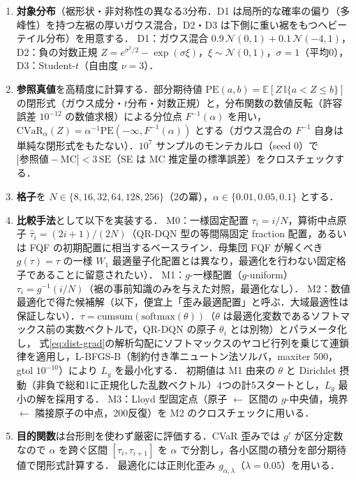 \documentclass[a4paper,10pt]{jsarticle}
\theoremstyle{definition}
\newcommand{\CVaR}{\mathrm{CVaR}}
\newcommand{\Finv}{F^{-1}}
\newcommand{\E}{\mathbb{E}}
\begin{document}
\begin{enumerate}
  \item \textbf{対象分布}（裾形状・非対称性の異なる3分布．D1 は局所的な確率の偏り（多峰性）を持つ左裾の厚いガウス混合，D2・D3 は下側に重い裾をもつヘビーテイル分布）を用意する．
  D1：ガウス混合 $0.9\,\mathcal N(0,1)+0.1\,\mathcal N(-4,1)$，
  D2：負の対数正規 $Z=e^{\sigma^2/2}-\exp(\sigma\xi)$，$\xi\sim\mathcal N(0,1)$，$\sigma=1$（平均0），
  D3：Student-$t$（自由度 $\nu=3$）．
  \item \textbf{参照真値}を高精度に計算する．部分期待値 $\mathrm{PE}(a,b)=\E[Z\,\mathbb{I}\{a<Z\le b\}]$ の閉形式（ガウス成分・$t$分布・対数正規）と，分布関数の数値反転（許容誤差 $10^{-12}$ の数値求根）による分位点 $\Finv(\alpha)$ を用い，
  $\CVaR_\alpha(Z)=\alpha^{-1}\mathrm{PE}(-\infty,\Finv(\alpha))$ とする（ガウス混合の $\Finv$ 自身は単純な閉形式をもたない）．$10^7$ サンプルのモンテカルロ（seed 0）で $|\text{参照値}-\text{MC}|<3\,\mathrm{SE}$（SE は MC 推定量の標準誤差）をクロスチェックする．
  \item \textbf{格子}を $N\in\{8,16,32,64,128,256\}$（2の冪），$\alpha\in\{0.01,0.05,0.1\}$ とする．
  \item \textbf{比較手法}として以下を実装する．
  M0：一様固定配置 $\tau_i=i/N$，算術中点原子 $\hat\tau_i=(2i+1)/(2N)$（QR-DQN 型の等間隔固定 fraction 配置，あるいは FQF の初期配置に相当するベースライン．母集団 FQF が解くべき $g(\tau)=\tau$ の一様 $W_1$ 最適量子化配置とは異なり，最適化を行わない固定格子であることに留意されたい）．
  M1：$g$-一様配置（$g$-uniform）$\tau_i=g^{-1}(i/N)$（裾の事前知識のみを与えた対照，最適化なし）．
  M2：数値最適化で得た候補解（以下，便宜上「歪み最適配置」と呼ぶ．大域最適性は保証しない）．$\tau=\mathrm{cumsum}(\mathrm{softmax}(\theta))$（$\theta$ は最適化変数であるソフトマックス前の実数ベクトルで，QR-DQN の原子 $\theta_i$ とは別物）とパラメータ化し，
  式\eqref{eq:dist-grad}の解析勾配にソフトマックスのヤコビ行列を乗じて連鎖律を適用し，L-BFGS-B（制約付き準ニュートン法ソルバ，maxiter 500，gtol $10^{-10}$）により $L_g$ を最小化する．
  初期値は M1 由来の $\theta$ と Dirichlet 摂動（非負で総和1に正規化した乱数ベクトル）4つの計5スタートとし，$L_g$ 最小の解を採用する．
  M3：Lloyd 型固定点（原子 $\leftarrow$ 区間の $g$-中央値，境界 $\leftarrow$ 隣接原子の中点，200反復）を M2 のクロスチェックに用いる．
  \item \textbf{目的関数}は台形則を使わず厳密に評価する．CVaR 歪みでは $g'$ が区分定数なので $\alpha$ を跨ぐ区間 $[\tau_i,\tau_{i+1}]$ を $\alpha$ で分割し，各小区間の積分を部分期待値で閉形式計算する．
  最適化には正則化歪み $g_{\alpha,\lambda}$（$\lambda=0.05$）を用いる．

\end{enumerate}
\end{document}
